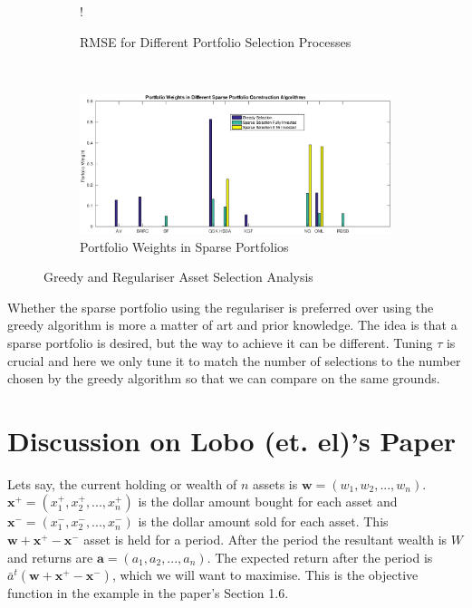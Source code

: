 \documentclass[11pt]{article}
\begin{document}
\begin{figure}[!h]
   \centering 
   \begin{subfigure}[b]{0.35\textwidth}
     	\resizebox {\textwidth} {!} { }
		\caption{RMSE for Different Portfolio Selection Processes}
		\label{fig:q3-rmse}
    \end{subfigure}
    ~
    \begin{subfigure}[b]{0.6\textwidth}
		\includegraphics[scale=.42] {q3_weights1.eps}
		\caption{Portfolio Weights in Sparse Portfolios}
		\label{fig:q3-weights}
    \end{subfigure}
    \caption{Greedy and Regulariser Asset Selection Analysis}
	\label{fig:q3-analysis}	
	\vspace{-0.4cm}
\end{figure}

Whether the sparse portfolio using the regulariser is preferred over using the greedy algorithm is more a matter of art and prior 
knowledge. The idea is that a sparse portfolio is desired, but the way to achieve it can be different. Tuning $\tau$ is crucial and
here we only tune it to match the number of selections to the number chosen by the greedy algorithm so that we can compare
on the same grounds.

\section{Discussion on Lobo (et. el)'s Paper}

Lets say, the current holding or wealth of $n$ assets is $\bm{w} = (w_1, w_2, ..., w_n)$. $\bm{x^+} = (x^+_1, x^+_2, ..., x^+_n)$ is
the dollar amount bought for each asset and $\bm{x^-} = (x^-_1, x^-_2, ..., x^-_n)$ is the dollar amount sold for each asset. This
$\bm{w} + \bm{x^+} - \bm{x^-}$ asset is held for a period. After the period the resultant wealth is $W$ and returns are $\bm{a} = (a_1, a_2, ..., a_n)$.
The expected return after the period is $\bar{a}^t(\bm{w} + \bm{x^+} - \bm{x^-})$, which we will want to maximise. This is the objective function
in the example in the paper's Section 1.6.\\
\end{document}
